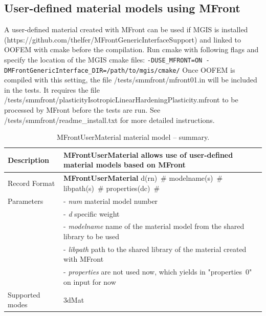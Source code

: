 \documentclass[a4paper]{article}
\newcommand{\descitem}[1]{{\noindent \bf #1}}
\newcommand{\elemparam}[2]{{{#1\tiny (#2)}~\#}}
\newcommand{\param}[1]{{\it #1}}
\newenvironment{mmt}{\begin{tabular}{|l|p{9cm}|}}{\end{tabular}\\}
\newenvironment{mmt}{\begin{tabular}{|l|l|}}{\end{tabular}\\}
\begin{document}
\subsection{User-defined material models using MFront}
A user-defined material created with MFront can be used if MGIS is installed
\newline
(https://github.com/thelfer/MFrontGenericInterfaceSupport) and linked to OOFEM with cmake before the compilation.
Run cmake with following flags and specify the location of the MGIS cmake files:
\newline
\verb|-DUSE_MFRONT=ON -DMFrontGenericInterface_DIR=/path/to/mgis/cmake/|
\newline
Once OOFEM is compiled with this setting, the file /tests/smmfront/mfront01.in will be included in the tests.
It requires the file
\newline
/tests/smmfront/plasticityIsotropicLinearHardeningPlasticity.mfront to be processed by MFront before the tests are run.
\newline
See /tests/smmfront/readme_install.txt for more detailed instructions.

\begin{table}[!htb]
\begin{mmt}
\hline
Description & MFrontUserMaterial allows use of user-defined material models based on MFront\\
\hline
Record Format & \descitem{MFrontUserMaterial}
\elemparam{d}{rn}
\elemparam{modelname}{s}
\elemparam{libpath}{s}
\elemparam{properties}{dc}\\
Parameters &- \param{num} material model number\\
&- \param{d} specific weight\\
&- \param{modelname} name of the material model from the shared library to be used \\
&- \param{libpath} path to the shared library of the material created with MFront \\
&- \param{properties} are not used now, which yields in "properties~0" on input for now \\

Supported modes& 3dMat\\
\hline
\end{mmt}
\caption{MFrontUserMaterial material model -- summary.}
\label{MFrontUserMaterial_table}
\end{table}
\end{document}
